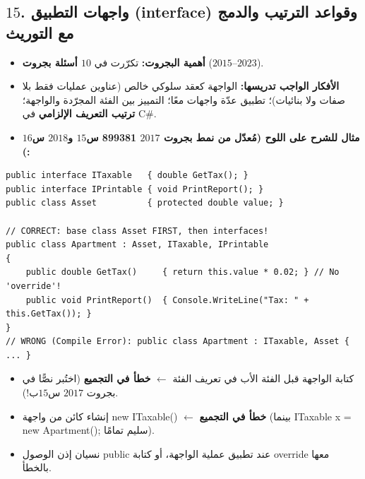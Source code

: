 \documentclass[14pt]{extarticle}
\begin{document}
\subsection*{$15$. واجهات التطبيق (\textenglish{interface}) وقواعد الترتيب والدمج مع التوريث}
\begin{itemize}[itemsep=0.25em]
    \item \textbf{أهمية البجروت:} تكرّرت في \textbf{$10$ أسئلة بجروت} ($2015$--$2023$).
    \item \textbf{الأفكار الواجب تدريسها:} الواجهة كعقد سلوكي خالص (عناوين عمليات فقط بلا صفات ولا بنائيات)؛ تطبيق عدّة واجهات معًا؛ التمييز بين الفئة المجرّدة والواجهة؛ \textbf{ترتيب التعريف الإلزامي} في \textenglish{C\#}.
    \item \textbf{مثال للشرح على اللوح (مُعدّل من نمط بجروت $2017$ \textenglish{899381} س$15$ و$2018$ س$16$):}
\end{itemize}
\begin{boxCode}
\begin{english}
\begin{verbatim}
public interface ITaxable   { double GetTax(); }
public interface IPrintable { void PrintReport(); }
public class Asset          { protected double value; }

// CORRECT: base class Asset FIRST, then interfaces!
public class Apartment : Asset, ITaxable, IPrintable
{
    public double GetTax()     { return this.value * 0.02; } // No 'override'!
    public void PrintReport()  { Console.WriteLine("Tax: " + this.GetTax()); }
}
// WRONG (Compile Error): public class Apartment : ITaxable, Asset { ... }
\end{verbatim}
\end{english}
\end{boxCode}
\begin{boxWarning}
\begin{itemize}
    \item كتابة الواجهة قبل الفئة الأب في تعريف الفئة $\leftarrow$ \textbf{خطأ في التجميع} (اختُبر نصًّا في بجروت $2017$ س$15$ب!).
    \item إنشاء كائن من واجهة \textenglish{new ITaxable()} $\leftarrow$ \textbf{خطأ في التجميع} (بينما \textenglish{ITaxable x = new Apartment();} سليم تمامًا).
    \item نسيان إذن الوصول \textenglish{public} عند تطبيق عملية الواجهة، أو كتابة \textenglish{override} معها بالخطأ.
\end{itemize}
\end{boxWarning}
\end{document}

